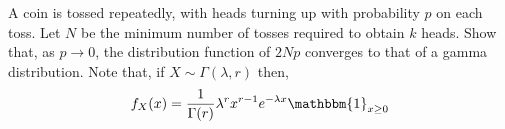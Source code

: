 \begin{solution}[Solution]
\begin{enumerate}

        


\end{enumerate} 
\end{solution}
    
\begin{problem}[Exercise 3.7]
A coin is tossed repeatedly, with heads turning up with probability \( p \) on each toss. Let \( N \) be the minimum number of tosses required to obtain \( k \) heads. Show that, as \( p\to 0 \), the distribution function of \( 2Np \) converges to that of a gamma distribution. Note that, if \(X \sim\Gamma(\lambda,r) \) then,
    \begin{align*}
        f_X(x) = \dfrac{1}{\Gamma(r)}\lambda^rx^{r-1}e^{-\lambda x}\mathbbm{1}_{x\geq 0}
    \end{align*}
\end{problem}

